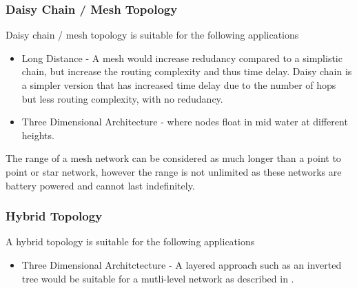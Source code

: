 \subsubsection{Daisy Chain / Mesh Topology}
Daisy chain / mesh topology is suitable for the following applications
\begin{itemize}
\item{Long Distance - A mesh would increase redudancy compared to a simplistic
chain, but increase the routing complexity and thus time delay. Daisy chain is
a simpler version that has increased time delay due to the number of hops
but less routing complexity, with no redudancy.}
\item{Three Dimensional Architecture \cite{POMPILI2009778} - where nodes float
in mid water at different heights.}
\end{itemize}

The range of a mesh network can be considered as much longer than a point to
point or star network, however the range is not unlimited as these networks
are battery powered and cannot last indefinitely.

\subsubsection{Hybrid Topology}
A hybrid topology is suitable for the following applications
\begin{itemize}
\item{Three Dimensional Architctecture - A layered approach such as an inverted tree would be
suitable for a mutli-level network as described in
\cite{tier_based_underwater_routing}.}
\end{itemize}
